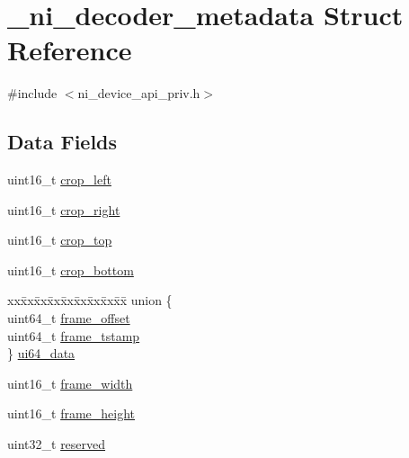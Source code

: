 \hypertarget{struct__ni__decoder__metadata}{}\section{\+\_\+ni\+\_\+decoder\+\_\+metadata Struct Reference}
\label{struct__ni__decoder__metadata}


{\ttfamily \#include $<$ni\+\_\+device\+\_\+api\+\_\+priv.\+h$>$}

\subsection*{Data Fields}
\begin{DoxyCompactItemize}
\item 
uint16\+\_\+t \mbox{\hyperlink{struct__ni__decoder__metadata_ab2cf3e99524a131554c5dacc50b0667d}{crop\+\_\+left}}
\item 
uint16\+\_\+t \mbox{\hyperlink{struct__ni__decoder__metadata_a8cd0742377920b93ddb3324a54f3be52}{crop\+\_\+right}}
\item 
uint16\+\_\+t \mbox{\hyperlink{struct__ni__decoder__metadata_ac691de506245105fda9ef50b5561da9a}{crop\+\_\+top}}
\item 
uint16\+\_\+t \mbox{\hyperlink{struct__ni__decoder__metadata_a5f6c40642a18d40affe353d6f67865b9}{crop\+\_\+bottom}}
\item 
\begin{tabbing}
xx\=xx\=xx\=xx\=xx\=xx\=xx\=xx\=xx\=\kill
union \{\\
\>uint64\_t \mbox{\hyperlink{struct__ni__decoder__metadata_a062e9b64b6ad5813dce0a6b71211d75b}{frame\_offset}}\\
\>uint64\_t \mbox{\hyperlink{struct__ni__decoder__metadata_aa94feb8f8cdb18a946cddfd49e096565}{frame\_tstamp}}\\
\} \mbox{\hyperlink{struct__ni__decoder__metadata_a3f616afcf24860475d0e476baeb6e320}{ui64\_data}}\\

\end{tabbing}\item 
uint16\+\_\+t \mbox{\hyperlink{struct__ni__decoder__metadata_a6bacf410ac8a6e1ed3030b91b6a3bd96}{frame\+\_\+width}}
\item 
uint16\+\_\+t \mbox{\hyperlink{struct__ni__decoder__metadata_a54cf73a089957b59b35344c368aa40aa}{frame\+\_\+height}}
\item 
uint32\+\_\+t \mbox{\hyperlink{struct__ni__decoder__metadata_aa43c4c21b173ada1b6b7568956f0d650}{reserved}}
\end{DoxyCompactItemize}


